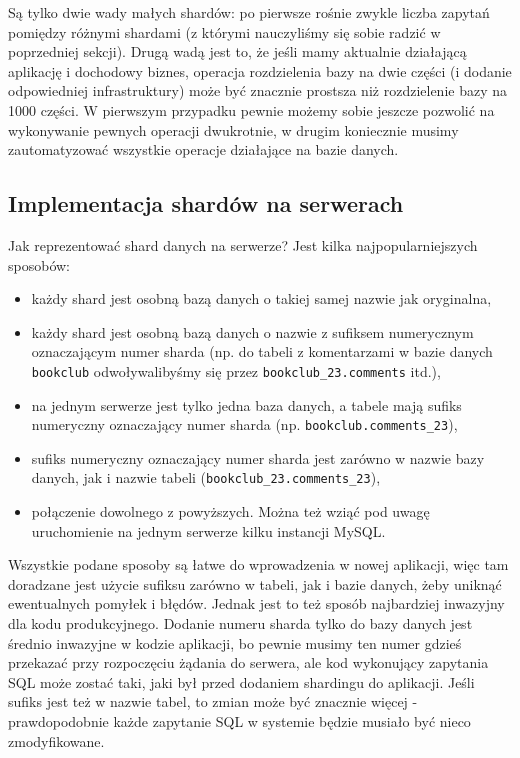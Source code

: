 \documentclass[a4paper,12pt]{article}
\begin{document}
Są tylko dwie wady małych shardów: po pierwsze rośnie zwykle liczba zapytań pomiędzy różnymi shardami (z którymi nauczyliśmy się sobie radzić w poprzedniej sekcji). Drugą wadą jest to, że jeśli mamy aktualnie działającą aplikację i dochodowy biznes, operacja rozdzielenia bazy na dwie części (i dodanie odpowiedniej infrastruktury) może być znacznie prostsza niż rozdzielenie bazy na 1000 części. W pierwszym przypadku pewnie możemy sobie jeszcze pozwolić na wykonywanie pewnych operacji dwukrotnie, w drugim koniecznie musimy zautomatyzować wszystkie operacje działające na bazie danych.

\subsection{Implementacja shardów na serwerach}

Jak reprezentować shard danych na serwerze? Jest kilka najpopularniejszych sposobów:

\begin{itemize}
 \setlength{\itemsep}{0.06cm}
 \setlength{\parskip}{0.06cm}
 \item każdy shard jest osobną bazą danych o takiej samej nazwie jak oryginalna,
 \item każdy shard jest osobną bazą danych o nazwie z sufiksem numerycznym oznaczającym numer sharda (np. do tabeli z komentarzami w bazie danych \texttt{bookclub} odwoływalibyśmy się przez \texttt{bookclub\_23.comments} itd.),
 \item na jednym serwerze jest tylko jedna baza danych, a tabele mają sufiks numeryczny oznaczający numer sharda (np. \texttt{bookclub.comments\_23}),
 \item sufiks numeryczny oznaczający numer sharda jest zarówno w nazwie bazy danych, jak i nazwie tabeli (\texttt{bookclub\_23.comments\_23}),
 \item połączenie dowolnego z powyższych. Można też wziąć pod uwagę uruchomienie na jednym serwerze kilku instancji MySQL.
\end{itemize}

Wszystkie podane sposoby są łatwe do wprowadzenia w nowej aplikacji, więc tam doradzane jest użycie sufiksu zarówno w tabeli, jak i bazie danych, żeby uniknąć ewentualnych pomyłek i błędów. Jednak jest to też sposób najbardziej inwazyjny dla kodu produkcyjnego. Dodanie numeru sharda tylko do bazy danych jest średnio inwazyjne w kodzie aplikacji, bo pewnie musimy ten numer gdzieś przekazać przy rozpoczęciu żądania do serwera, ale kod wykonujący zapytania SQL może zostać taki, jaki był przed dodaniem shardingu do aplikacji. Jeśli sufiks jest też w nazwie tabel, to zmian może być znacznie więcej - prawdopodobnie każde zapytanie SQL w systemie będzie musiało być nieco zmodyfikowane.
\end{document}
